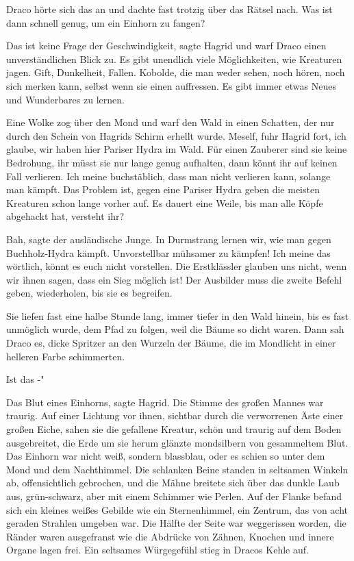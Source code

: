 Draco hörte sich das an und dachte fast trotzig über das Rätsel nach. \glqq{}Was
ist dann schnell genug, um ein Einhorn zu fangen?\grqq{}

\glqq{}Das ist keine Frage der Geschwindigkeit\grqq{}, sagte Hagrid und warf
Draco einen unverständlichen Blick zu. \glqq{}Es gibt unendlich viele
Möglichkeiten, wie Kreaturen jagen. Gift, Dunkelheit, Fallen. Kobolde,
die man weder sehen, noch hören, noch sich merken kann, selbst wenn sie
einen auffressen. Es gibt immer etwas Neues und Wunderbares zu
lernen.\grqq{}

Eine Wolke zog über den Mond und warf den Wald in einen Schatten, der nur durch
den Schein von Hagrids Schirm erhellt wurde. \glqq{}Meself\grqq{}, fuhr
Hagrid fort, \glqq{}ich glaube, wir haben hier Pariser Hydra im Wald. Für
einen Zauberer sind sie keine Bedrohung, ihr müsst sie nur lange genug
aufhalten, dann könnt ihr auf keinen Fall verlieren. Ich meine
buchstäblich, dass man nicht verlieren kann, solange man kämpft. Das
Problem ist, gegen eine Pariser Hydra geben die meisten Kreaturen schon
lange vorher auf. Es dauert eine Weile, bis man alle Köpfe abgehackt hat,
versteht ihr?\grqq{}

\glqq{}Bah\grqq{}, sagte der ausländische Junge. \glqq{}In Durmstrang lernen wir,
wie man gegen Buchholz-Hydra kämpft. Unvorstellbar mühsamer zu kämpfen!
Ich meine das wörtlich, könnt es euch nicht vorstellen. Die Erstklässler
glauben uns nicht, wenn wir ihnen sagen, dass ein Sieg möglich ist! Der
Ausbilder muss die zweite Befehl geben, wiederholen, bis sie es
begreifen.\grqq{}

Sie liefen fast eine halbe Stunde lang, immer tiefer in den Wald hinein, bis es
fast unmöglich wurde, dem Pfad zu folgen, weil die Bäume so dicht waren.
Dann sah Draco es, dicke Spritzer an den Wurzeln der Bäume, die im
Mondlicht in einer helleren Farbe schimmerten.

\glqq{}Ist das -"

\glqq{}Das Blut eines Einhorns\grqq{}, sagte Hagrid. Die Stimme des großen Mannes
war traurig. Auf einer Lichtung vor ihnen, sichtbar durch die verworrenen
Äste einer großen Eiche, sahen sie die gefallene Kreatur, schön und
traurig auf dem Boden ausgebreitet, die Erde um sie herum glänzte
mondsilbern von gesammeltem Blut. Das Einhorn war nicht weiß, sondern
blassblau, oder es schien so unter dem Mond und dem Nachthimmel. Die
schlanken Beine standen in seltsamen Winkeln ab, offensichtlich
gebrochen, und die Mähne breitete sich über das dunkle Laub aus,
grün-schwarz, aber mit einem Schimmer wie Perlen. Auf der Flanke befand
sich ein kleines weißes Gebilde wie ein Sternenhimmel, ein Zentrum, das
von acht geraden Strahlen umgeben war. Die Hälfte der Seite war
weggerissen worden, die Ränder waren ausgefranst wie die Abdrücke von
Zähnen, Knochen und innere Organe lagen frei. Ein seltsames Würgegefühl
stieg in Dracos Kehle auf.

